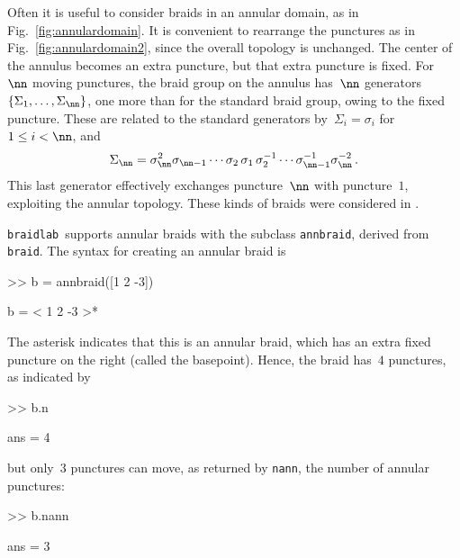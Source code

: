 \documentclass[12pt]{article}
\newcommand{\braidlab}{\texttt{braidlab}}%
\newcommand{\braid}{\texttt{braid}}%
\newcommand{\annbraid}{\texttt{annbraid}}%
\begin{document}
Often it is useful to consider braids in an annular domain, as in
Fig.~\ref{fig:annulardomain}.  It is convenient to rearrange the punctures as
in Fig.~\ref{fig:annulardomain2}, since the overall topology is unchanged.
The center of the annulus becomes an extra puncture, but that extra puncture
is fixed.  For~$\nn$ moving punctures, the braid group on the annulus
has~$\nn$ generators~$\{\Sigma_1,\ldots,\Sigma_\nn\}$, one more than for the
standard braid group, owing to the fixed puncture.  These are related to the
standard generators by~$\Sigma_i=\sigma_i$ for~$1 \le i <\nn$, and
\begin{equation}
  \Sigma_\nn = \sigma_\nn^2 \sigma_{\nn-1} \cdots \sigma_2\,\sigma_1\,
  \sigma_2^{-1} \cdots \sigma_{\nn-1}^{-1} \sigma_\nn^{-2}\,.
  \label{eq:Sigman}
\end{equation}
This last generator effectively exchanges puncture~$\nn$ with puncture~$1$,
exploiting the annular topology.  These kinds of braids were considered in
\citet{Boyland1994,MattFinn2006,MattFinn2011_silver}.

\braidlab\ supports annular braids with the subclass \annbraid, derived from
\braid.  The syntax for creating an annular braid is
\begin{lstbraidlab}
>> b = annbraid([1 2 -3])

b = < 1  2 -3 >*
\end{lstbraidlab}
The asterisk indicates that this is an annular braid, which has an extra fixed
puncture on the right (called the basepoint).  Hence, the braid has~$4$
punctures, as indicated by
\begin{lstbraidlab}
>> b.n    %

ans = 4
\end{lstbraidlab}
but only~$3$ punctures can move, as returned by \lstinline{nann}, the number
of annular punctures:
\begin{lstbraidlab}
>> b.nann    %

ans = 3
\end{lstbraidlab}
\end{document}
